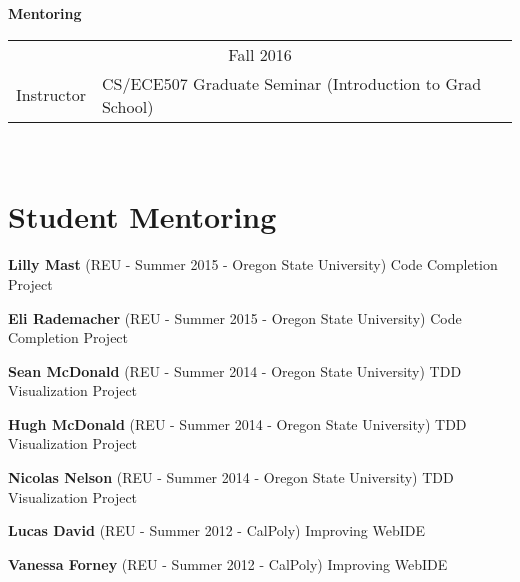 \documentclass[10pt]{article}
\begin{document}
\vspace{10pt}




\textbf{Mentoring} \\
\vspace{-10pt}
\noindent\begin{tabular}{p{3cm}p{9.5cm}}
\multicolumn{2}{c}{Fall 2016}\\
Instructor & CS/ECE507 Graduate Seminar (Introduction to Grad School)\\


\end{tabular}\\
\vspace{10pt}

\section{Student Mentoring}
\begin{bibsection}
\setlength\itemsep{2pt}

\item \textbf{Lilly Mast } (REU - Summer 2015 - Oregon State University) Code Completion Project
\item \textbf{Eli Rademacher } (REU - Summer 2015 - Oregon State University) Code Completion Project
\item \textbf{Sean McDonald } (REU - Summer 2014 - Oregon State University) TDD Visualization Project
\item \textbf{Hugh McDonald } (REU - Summer 2014 - Oregon State University) TDD Visualization Project
\item \textbf{Nicolas Nelson} (REU - Summer 2014 - Oregon State University) TDD Visualization Project
\item \textbf{Lucas David} (REU - Summer 2012 - CalPoly) Improving WebIDE
\item \textbf{Vanessa Forney} (REU - Summer 2012 - CalPoly) Improving WebIDE
\end{bibsection}
\end{document}
